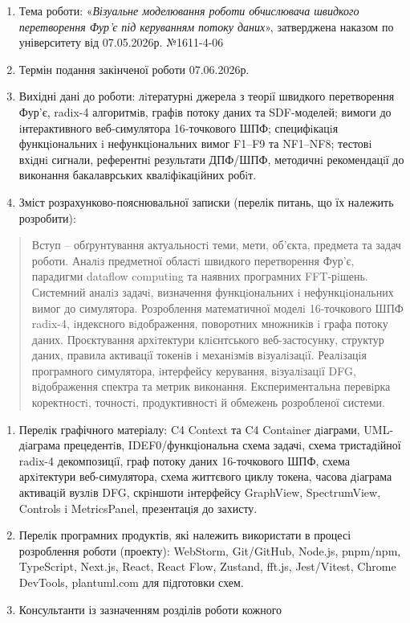 \documentclass[
]{article}
\begin{document}
\begin{enumerate}
\def\labelenumi{\arabic{enumi}.}
\item
  Тема роботи: «\emph{Візуальне моделювання роботи обчислювача швидкого
  перетворення Фур'є під керуванням потоку даних}», затверджена наказом
  по університету від 07.05.2026р. №1611-4-06
\item
  Термін подання закінченої роботи 07.06.2026р.
\item
  Вихідні дані до роботи: лiтературнi джерела з теорiї швидкого
  перетворення Фур'є, radix-4 алгоритмiв, графiв потоку даних та
  SDF-моделей; вимоги до iнтерактивного веб-симулятора 16-точкового ШПФ;
  специфiкацiя функцiональних i нефункцiональних вимог F1--F9 та
  NF1--NF8; тестовi вхiднi сигнали, референтнi результати ДПФ/ШПФ,
  методичнi рекомендацiї до виконання бакалаврських квалiфiкацiйних
  робiт.
\item
  Зміст розрахунково-пояснювальної записки (перелік питань, що їх
  належить розробити):
\end{enumerate}

\begin{quote}
Вступ -- обґрунтування актуальностi теми, мети, об'єкта, предмета та
задач роботи. Аналiз предметної областi швидкого перетворення Фур'є,
парадигми dataflow computing та наявних програмних FFT-рiшень. Системний
аналiз задачi, визначення функцiональних i нефункцiональних вимог до
симулятора. Розроблення математичної моделi 16-точкового ШПФ radix-4,
iндексного вiдображення, поворотних множникiв i графа потоку даних.
Проєктування архiтектури клiєнтського веб-застосунку, структур даних,
правила активацiї токенiв i механiзмiв вiзуалiзацiї. Реалiзацiя
програмного симулятора, iнтерфейсу керування, вiзуалiзацiї DFG,
вiдображення спектра та метрик виконання. Експериментальна перевiрка
коректностi, точностi, продуктивностi й обмежень розробленої системи.
\end{quote}

\begin{enumerate}
\def\labelenumi{\arabic{enumi}.}
\setcounter{enumi}{4}
\item
  Перелік графічного матеріалу: C4 Context та C4 Container дiаграми,
  UML-дiаграма прецедентiв, IDEF0/функцiональна схема задачi, схема
  тристадiйної radix-4 декомпозицiї, граф потоку даних 16-точкового ШПФ,
  схема архiтектури веб-симулятора, схема життєвого циклу токена, часова
  дiаграма активацiй вузлiв DFG, скрiншоти iнтерфейсу GraphView,
  SpectrumView, Controls i MetricsPanel, презентацiя до захисту.
\item
  Перелік програмних продуктів, які належить використати в процесі
  розроблення роботи (проекту): WebStorm, Git/GitHub, Node.js, pnpm/npm,
  TypeScript, Next.js, React, React Flow, Zustand, fft.js, Jest/Vitest,
  Chrome DevTools, plantuml.com для пiдготовки схем.
\item
  Консультанти із зазначенням розділів роботи кожного
\end{enumerate}
\end{document}
